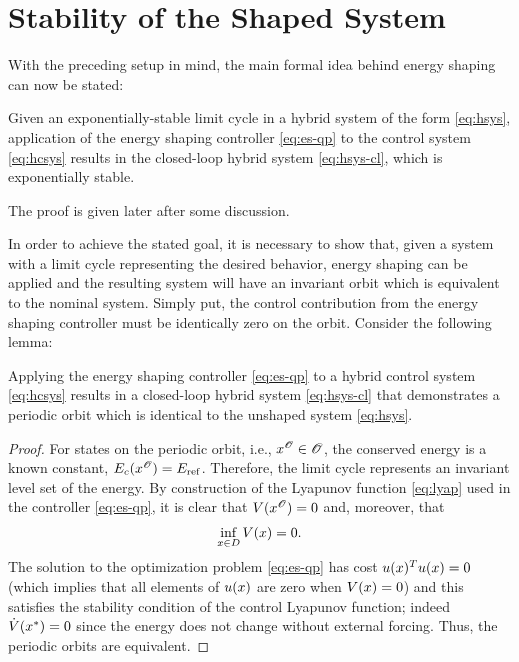 \section{Stability of the Shaped System} \label{sec:stab}

With the preceding setup in mind, the main formal idea behind energy shaping can
now be stated:
% 
\begin{theorem}
  \label{theorem:main-theorem}
  Given an exponentially-stable limit cycle in a hybrid system of the form
  \eqref{eq:hsys}, application of the energy shaping controller \eqref{eq:es-qp}
  to the control system \eqref{eq:hcsys} results in the closed-loop hybrid
  system \eqref{eq:hsys-cl}, which is exponentially stable.
\end{theorem}
% 

The proof is given later after some discussion.


In order to achieve the stated goal, it is necessary to show that, given a
system with a limit cycle representing the desired behavior, energy shaping can
be applied and the resulting system will have an invariant orbit which is
equivalent to the nominal system. Simply put, the control contribution from the
energy shaping controller must be identically zero on the orbit. Consider the
following lemma:

\begin{lemma}
  Applying the energy shaping controller \eqref{eq:es-qp} to a hybrid control
  system \eqref{eq:hcsys} results in a closed-loop hybrid system
  \eqref{eq:hsys-cl} that demonstrates a periodic orbit which is identical to
  the unshaped system \eqref{eq:hsys}.
\end{lemma}

\begin{proof}
  For states on the periodic orbit, i.e., $x^{\mathscr{O}} \in \mathscr{O}$, the conserved energy
  is a known constant, $E_{c}(x^{\mathscr{O}}) = E_{\mathrm{ref}}$.
  Therefore, the limit cycle represents an invariant level set of the energy.
  By construction of the Lyapunov function \eqref{eq:lyap} used in the
  controller \eqref{eq:es-qp}, it is clear that $V(x^{\mathscr{O}}) = 0$ and, moreover, that
  \begin{align*}
    \inf_{x \in D} V(x) = 0.
  \end{align*}
  The solution to the optimization problem \eqref{eq:es-qp} has cost $u(x)^T
  u(x) = 0$ (which implies that all elements of $u(x)$ are zero when $V(x) =
  0$) and this satisfies the stability condition of the control Lyapunov
  function;
  indeed ${\dot V}(x^{*}) = 0$ since the energy does not change without external
  forcing.
  Thus, the periodic orbits are equivalent.
\end{proof}

